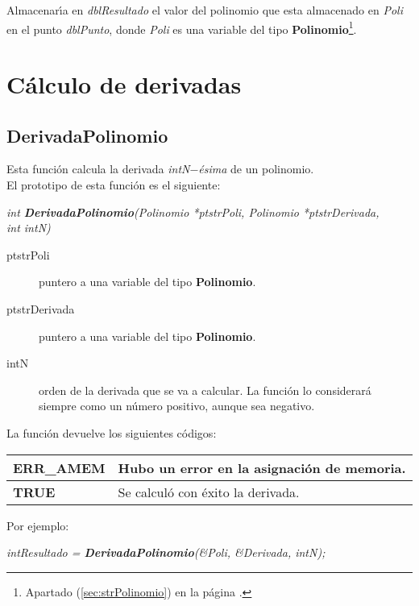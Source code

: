 Almacenar\'{\i}a en \emph{dblResultado} el valor del polinomio que esta
almacenado en \emph{Poli} en el punto \emph{dblPunto}, donde \emph{Poli} es
una variable del tipo \textbf{Polinomio}\footnote{Apartado
(\ref{sec:strPolinomio}) en la p\'agina \pageref{sec:strPolinomio}.}.

\newpage

\section{C\'alculo de derivadas}

\subsection{DerivadaPolinomio}

Esta funci\'on calcula la derivada \emph{intN$-$\'esima} de un polinomio.\\

El prototipo de esta funci\'on es el siguiente:

\begin{center}
\emph{int \textbf{DerivadaPolinomio}(Polinomio *ptstrPoli,
Polinomio *ptstrDerivada,\\ int intN)}
\end{center}

\begin{description}
\item[ptstrPoli] puntero a una variable del tipo \textbf{Polinomio}.
\item[ptstrDerivada] puntero a una variable del tipo \textbf{Polinomio}.
\item[intN] orden de la derivada que se va a calcular. La funci\'on lo 
considerar\'a siempre como un n\'umero positivo, aunque sea negativo.
\end{description}

La funci\'on devuelve los siguientes c\'odigos:

\begin{center}
\begin{tabular}{|l|l|}
\hline
\textbf{ERR\_AMEM} & Hubo un error en la asignaci\'on de memoria. \\
\hline
\textbf{TRUE} & Se calcul\'o con \'exito la derivada. \\
\hline
\end{tabular}
\end{center}

Por ejemplo:

\begin{center}
\emph{intResultado = \textbf{DerivadaPolinomio}(\&Poli, \&Derivada, intN);}
\end{center}

